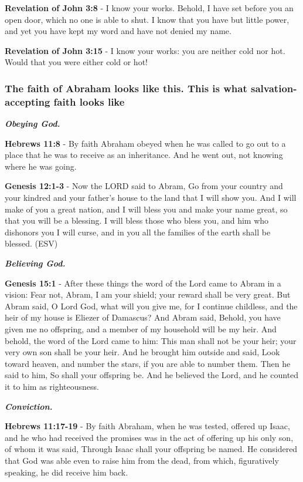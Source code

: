 \documentclass[11pt]{article}
\begin{document}
\textbf{Revelation of John 3:8} - I know your works. Behold, I have set before you an open door, which no one is able to shut. I know that you have but little power, and yet you have kept my word and have not denied my name.

\textbf{Revelation of John 3:15} - I know your works: you are neither cold nor hot. Would that you were either cold or hot!

\subsubsection{The faith of Abraham looks like this. This is what salvation-accepting faith looks like}
\label{sec:orgd3443e7}

\emph{\textbf{Obeying God.}}

\textbf{Hebrews 11:8} - By faith Abraham obeyed when he was called to go out to a place that he was to receive as an inheritance. And he went out, not knowing where he was going.

\textbf{Genesis 12:1-3} - Now the LORD said to Abram, Go from your country and your kindred and your father's house to the land that I will show you. And I will make of you a great nation, and I will bless you and make your name great, so that you will be a blessing. I will bless those who bless you, and him who dishonors you I will curse, and in you all the families of the earth shall be blessed. (ESV)

\emph{\textbf{Believing God.}}

\textbf{Genesis 15:1} - After these things the word of the Lord came to Abram in a vision: Fear not, Abram, I am your shield; your reward shall be very great.  But Abram said, O Lord God, what will you give me, for I continue childless, and the heir of my house is Eliezer of Damascus?  And Abram said, Behold, you have given me no offspring, and a member of my household will be my heir.  And behold, the word of the Lord came to him: This man shall not be your heir; your very own son shall be your heir.  And he brought him outside and said, Look toward heaven, and number the stars, if you are able to number them. Then he said to him, So shall your offspring be.  And he believed the Lord, and he counted it to him as righteousness.

\emph{\textbf{Conviction.}}

\textbf{Hebrews 11:17-19} - By faith Abraham, when he was tested, offered up Isaac, and he who had received the promises was in the act of offering up his only son, of whom it was said, Through Isaac shall your offspring be named. He considered that God was able even to raise him from the dead, from which, figuratively speaking, he did receive him back.
\end{document}
